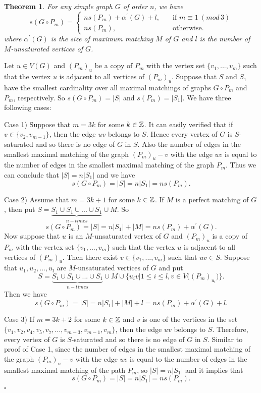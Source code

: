 \documentclass[11pt]{article}
\newtheorem{theorem}{Theorem}[section]
\newcommand{\proof}{\noindent{\bf Proof.\ }}
\newcommand{\qed}{\hfill $\square$\medskip}
\begin{document}
\begin{theorem}\label{GPm}
For any simple graph $G$ of order $n$, we have $$s(G\circ {P_m})=\left\{
\begin{array}{lcl}
ns(P_m)+\alpha^{\prime}(G)+l, & \quad\mbox{if $m\equiv 1 ~ (mod\, 3)$}\\[15pt]
ns(P_m), & \quad\mbox{otherwise.}
\end{array}
\right.$$ where $\alpha^{\prime}(G)$ is the size of maximum matching $M$ of $G$ and $l$ is the number of 
$M$-unsaturated vertices of $G$.
\end{theorem}

\proof
Let $u\in V(G)$ and ${(P_m)}_u$ be a copy of $P_m$ with the vertex set $\{v_1,...,v_m\}$ such that the vertex $u$ is adjacent to all vertices of ${(P_m)}_u$. Suppose that  $S$ and $S_1$ have the smallest cardinality over all maximal matchings of graphs $G\circ P_m$ and $P_m$, respectively. So $s(G\circ P_m)=|S|$ and $s(P_m)=|S_1|$. We have three following cases: 

\medskip
Case 1) Suppose that $m=3k$ for some $k\in \Bbb{Z}$. It can easily verified that if $v\in \{v_2, v_{m-1}\}$, then the 
edge $uv$ belongs to $S$. Hence every vertex of $G$ is $S$-saturated and so there is no edge of $G$ in $S$. 
Also the number of edges in the smallest maximal matching of the graph ${(P_m)}_u-v$ with the edge 
$uv$ is equal to the number of edges in the smallest maximal matching of the graph $P_m$. Thus we can conclude that 
$|S|=n|S_1|$ and we have $$s(G\circ P_m)=|S|=n|S_1|=ns(P_m).$$
 
Case 2) Assume that $m=3k+1$ for some $k\in \Bbb{Z}$. If $M$ is a perfect matching of $G$, then put $S=\underbrace{S_1\cup S_1\cup ...\cup S_1}_{n-times}\cup M$. So $$s(G\circ P_m)=|S|=n|S_1|+|M|=ns(P_m)+\alpha^{\prime}(G).$$ 
Now suppose that $u$ is an $M$-unsaturated vertex of $G$ and ${(P_m)}_u$ is a copy of $P_m$ with the vertex set 
$\{v_1,...,v_m\}$ such that the vertex $u$ is adjacent to all vertices of ${(P_m)}_u$. Then there exist 
$v\in \{v_1,...,v_m\}$ such that $uv\in S$. Suppose that $u_1, u_2, ..., u_l$ are $M$-unsaturated vertices of $G$ and put  
$$S=\underbrace{S_1\cup S_1\cup ...\cup S_1}_{n-times}\cup M\cup \big\{u_iv|1\leq i\leq l, v\in V\big({(P_m)}_{u_i}\big)\big\}.$$ Then we have $$s(G\circ P_m)=|S|=n|S_1|+|M|+l=ns(P_m)+\alpha^{\prime}(G)+l.$$ 

Case 3) If $m=3k+2$ for some $k\in \Bbb{Z}$ and $v$ is one of the vertices in the set $\{v_1, v_2, v_4, v_5, v_7, ..., v_{m-3}, v_{m-1}, v_{m}\}$, then the edge $uv$ belongs to $S$.
 Therefore, every vertex of $G$ is $S$-saturated and so there is no edge of $G$ in $S$.
Similar to  proof of Case 1, since the number of edges in the smallest maximal matching of the graph 
${(P_m)}_u-v$ with the edge $uv$ is equal to the number of edges in the smallest maximal matching of the path  
$P_m$, so $|S|=n|S_1|$ and it implies that $$s(G\circ P_m)=|S|=n|S_1|=ns(P_m).$$ 
\qed
\end{document}
